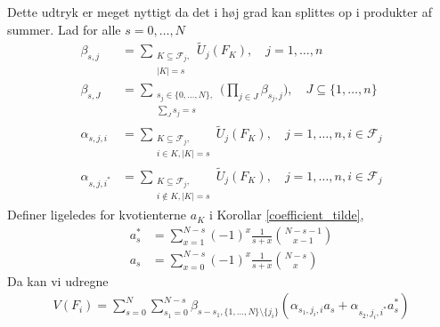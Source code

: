 \documentclass[a4paper, 12pt]{article}
\begin{document}
Dette udtryk er meget nyttigt da det i høj grad kan splittes op i produkter af summer. Lad for alle $s=0,\dots, N$
\begin{align}
\beta_{s,j}&=\sum_{\substack{K\subseteq \mathcal F_j,\\ |K|=s}} \tilde U_j(F_K), \quad  j=1, \dots, n\\
\beta_{s,J}&=\sum_{\substack{s_{j} \in \{0, \dots, N\},\\ \sum_{J} s_{j}=s}}\biggl( \prod_{j \in J} \beta_{s_j,j}\biggr), \quad J\subseteq \{1, \dots, n\}\\
\alpha_{s,j,i}&=\sum_{\substack{K\subseteq \mathcal F_j, \\
i\in K, |K|=s}}\tilde U_j(F_K), \quad j=1,\dots, n, i\in\mathcal F_j \\
\alpha_{s,j,i^*}&=\sum_{\substack{K\subseteq \mathcal F_j, \\
i\not\in K, |K|=s}}\tilde U_j(F_K), \quad j=1,\dots, n, i\in\mathcal F_j 
\end{align}
Definer ligeledes for kvotienterne $a_K$ i Korollar \ref{coefficient_tilde},
\begin{align}
a_{s}^*&=\sum_{x=1}^{N-s}(-1)^x\frac{1}{s+x}{N-s-1 \choose x-1} \\
a_s&=\sum_{x=0}^{N-s} (-1)^x \frac{1}{s+x}{N-s\choose x}
\end{align}
Da kan vi udregne 
\begin{align}
V(F_i)=\sum_{s=0}^{N} \sum_{s_1=0}^{N-s} \beta_{s-s_1, \{1, \dots, N\}\setminus \{j_i\}}(\alpha_{s_1,j_i,i}a_s+\alpha_{s_2, j_i,i^*}a_s^*)
\end{align}
\end{document}
